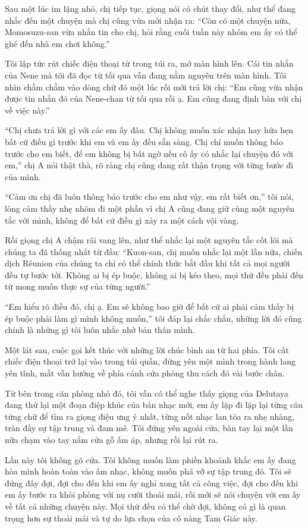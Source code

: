 \documentclass[../main.tex]{subfiles}
\begin{document}
Sau một lúc im lặng nhỏ, chị tiếp tục, giọng nói có chút thay đổi, như thể đang nhắc đến một chuyện mà chị cũng vừa mới nhận ra: ``Còn có một chuyện nữa, Momosuzu-san vừa nhắn tin cho chị, hỏi rằng cuối tuần này nhóm em ấy có thể ghé đến nhà em chơi không.''

Tôi lập tức rút chiếc điện thoại từ trong túi ra, mở màn hình lên. Cái tin nhắn của Nene mà tôi đã đọc từ tối qua vẫn đang nằm nguyên trên màn hình. Tôi nhìn chằm chằm vào dòng chữ đó một lúc rồi mới trả lời chị: ``Em cũng vừa nhận được tin nhắn đó của Nene-chan từ tối qua rồi ạ. Em cũng đang định bàn với chị về việc này.''

``Chị chưa trả lời gì với các em ấy đâu. Chị không muốn xác nhận hay hứa hẹn bất cứ điều gì trước khi em và em ấy đều sẵn sàng. Chị chỉ muốn thông báo trước cho em biết, để em không bị bất ngờ nếu cô ấy có nhắc lại chuyện đó với em,'' chị A nói thật thà, rõ ràng chị cũng đang rất thận trọng với từng bước đi của mình.

``Cảm ơn chị đã luôn thông báo trước cho em như vậy, em rất biết ơn,'' tôi nói, lòng cảm thấy nhẹ nhõm đi một phần vì chị A cũng đang giữ cùng một nguyên tắc với mình, không để bất cứ điều gì xảy ra một cách vội vàng.

Rồi giọng chị A chậm rãi vang lên, như thể nhắc lại một nguyên tắc cốt lõi mà chúng ta đã thống nhất từ đầu: ``Kuon-san, chị muốn nhắc lại một lần nữa, chiến dịch Réunion của chúng ta chỉ có thể chính thức bắt đầu khi tất cả mọi người đều tự bước tới. Không ai bị ép buộc, không ai bị kéo theo, mọi thứ đều phải đến từ mong muốn thực sự của từng người.''

``Em hiểu rõ điều đó, chị ạ. Em sẽ không bao giờ để bất cứ ai phải cảm thấy bị ép buộc phải làm gì mình không muốn,'' tôi đáp lại chắc chắn, những lời đó cũng chính là những gì tôi luôn nhắc nhở bản thân mình.

Một lát sau, cuộc gọi kết thúc với những lời chúc bình an từ hai phía. Tôi cất chiếc điện thoại trở lại vào trong túi quần, đứng yên một mình trong hành lang yên tĩnh, mắt vẫn hướng về phía cánh cửa phòng thu cách đó vài bước chân.

Từ bên trong căn phòng nhỏ đó, tôi vẫn có thể nghe thấy giọng của Delutaya đang thử lại một đoạn điệp khúc của bản nhạc mới, em ấy lặp đi lặp lại từng câu từng chữ để tìm ra giọng điệu ưng ý nhất, từng nốt nhạc lan tỏa ra nhẹ nhàng, tràn đầy sự tập trung và đam mê. Tôi đứng yên ngoài cửa, bàn tay lại một lần nữa chạm vào tay nắm cửa gỗ ấm áp, nhưng rồi lại rút ra.

Lần này tôi không gõ cửa. Tôi không muốn làm phiền khoảnh khắc em ấy đang hòa mình hoàn toàn vào âm nhạc, không muốn phá vỡ sự tập trung đó. Tôi sẽ đứng đây đợi, đợi cho đến khi em ấy nghỉ xong tất cả công việc, đợi cho đến khi em ấy bước ra khỏi phòng với nụ cười thoải mái, rồi mới sẽ nói chuyện với em ấy về tất cả những chuyện này. Mọi thứ đều có thể chờ đợi, không có gì là quan trọng hơn sự thoải mái và tự do lựa chọn của cô nàng Tam Giác này.
\end{document}
